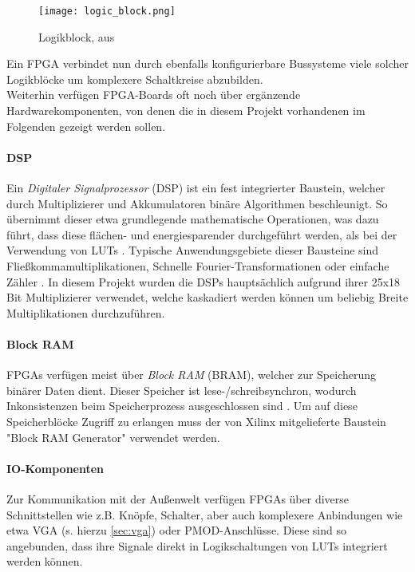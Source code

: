 \documentclass[a4paper,12pt,onesided]{report}
\begin{document}
\begin{figure}[H]
	\centering
	\texttt{[image: logic\_block.png]}
	\caption{Logikblock, aus \cite{fpgaDesign}}
	\label{fig:logikblock}
\end{figure}

Ein FPGA verbindet nun durch ebenfalls konfigurierbare Bussysteme viele solcher Logikblöcke um komplexere Schaltkreise abzubilden.\\
Weiterhin verfügen FPGA-Boards oft noch über ergänzende Hardwarekomponenten, von denen die in diesem Projekt vorhandenen im Folgenden gezeigt werden sollen.

\paragraph{DSP}
Ein \textit{Digitaler Signalprozessor} (DSP) ist ein fest integrierter Baustein, welcher durch Multiplizierer und Akkumulatoren binäre Algorithmen beschleunigt.
So übernimmt dieser etwa grundlegende mathematische Operationen, was dazu führt, dass diese flächen- und energiesparender durchgeführt werden, als bei der Verwendung von LUTs \cite[S. 52]{dsps}.
Typische Anwendungsgebiete dieser Bausteine sind Fließkommamultiplikationen, Schnelle Fourier-Transformationen oder einfache Zähler \cite[S. 14]{dsps}. 
In diesem Projekt wurden die DSPs hauptsächlich aufgrund ihrer 25x18 Bit Multiplizierer verwendet, welche kaskadiert werden können um beliebig Breite Multiplikationen durchzuführen.

\paragraph{Block RAM}
FPGAs verfügen meist über \textit{Block RAM} (BRAM), welcher zur Speicherung binärer Daten dient. Dieser Speicher ist lese-/schreibsynchron, wodurch Inkonsistenzen beim Speicherprozess ausgeschlossen sind \cite[S. 11]{bram}. Um auf diese Speicherblöcke Zugriff zu erlangen muss der von Xilinx mitgelieferte Baustein "Block RAM Generator" verwendet werden.

\paragraph{IO-Komponenten}
Zur Kommunikation mit der Außenwelt verfügen FPGAs über diverse Schnittstellen wie z.B. Knöpfe, Schalter, aber auch komplexere Anbindungen wie etwa VGA (s. hierzu \autoref{sec:vga}) oder PMOD-Anschlüsse.
Diese sind so angebunden, dass ihre Signale direkt in Logikschaltungen von LUTs integriert werden können.
\end{document}
